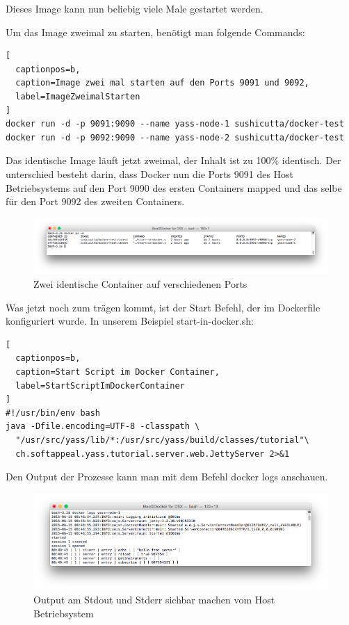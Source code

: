 Dieses Image kann nun beliebig viele Male gestartet werden.

Um das Image zweimal zu starten, benötigt man folgende Commands:
\\

\begin{lstlisting}[
  captionpos=b,
  caption=Image zwei mal starten auf den Ports 9091 und 9092,
  label=ImageZweimalStarten
]
docker run -d -p 9091:9090 --name yass-node-1 sushicutta/docker-test
docker run -d -p 9092:9090 --name yass-node-2 sushicutta/docker-test
\end{lstlisting}

Das identische Image läuft jetzt zweimal, der Inhalt ist zu 100\% identisch. Der unterschied
besteht darin, dass Docker nun die Ports 9091 des Host Betriebsystems auf den Port 9090 des
ersten Containers mapped und das selbe für den Port 9092 des zweiten Containers.

\begin{figure}[htbp]
  \begin{center}
    \includegraphics[width=1.0\textwidth]{./images/twoProcesses.png}
    \caption{Zwei identische Container auf verschiedenen Ports}
    \label{img:twoProcesses}
  \end{center}
\end{figure}

Was jetzt noch zum trägen kommt, ist der Start Befehl, der im Dockerfile
konfiguriert wurde. In unserem Beispiel start-in-docker.sh:
\\

\begin{lstlisting}[
  captionpos=b,
  caption=Start Script im Docker Container,
  label=StartScriptImDockerContainer
]
#!/usr/bin/env bash
java -Dfile.encoding=UTF-8 -classpath \
  "/usr/src/yass/lib/*:/usr/src/yass/build/classes/tutorial"\
  ch.softappeal.yass.tutorial.server.web.JettyServer 2>&1
\end{lstlisting}

Den Output der Prozesse kann man mit dem Befehl docker logs anschauen.

\begin{figure}[htbp]
  \begin{center}
    \includegraphics[width=1.0\textwidth]{./images/logOutput.png}
    \caption{Output am Stdout und Stderr sichbar machen vom Host Betriebsystem}
    \label{img:logOutput}
  \end{center}
\end{figure}





